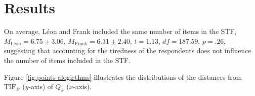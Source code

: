 \documentclass{svproc}
\begin{document}
\section{Results}

%

On average, Léon and Frank included the same number of items in the STF, $M_{\text{Léon}} = 6.75 \pm 3.06$, $M_{\text{Frank}} = 6.31 \pm 2.40$, $t = 1.13$, $df = 187.59$, $p = .26$, suggesting that accounting for the tiredness of the respondents does not influence the number of items included in the STF.

Figure \ref{fig:points-alogirthms} illustrates the distributions of the distances from $\text{TIF}_B$ ($y$-axis) of $Q_x$ ($x$-axis).
\end{document}
